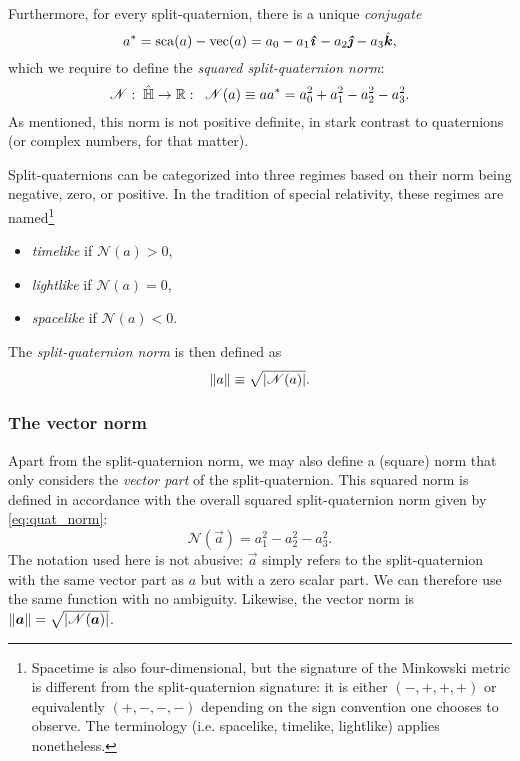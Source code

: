 Furthermore, for every split-quaternion, there is a unique \emph{conjugate}
\begin{equation}
     \conj{a} = \scapart{a} - \vecpart{a} = a_0 - a_1\quati - a_2\quatj - a_3\quatk,
\end{equation}
which we require to define the \emph{squared split-quaternion norm}:
\begin{equation}
    \mathscr{N}:\;\hat{\mathbb{H}} \to \mathbb{R}:\;\;\mathscr{N}(a) \equiv aa^* = a_0^2 + a_1^2 - a_2^2 - a_3^2. 
    \label{eq:quat_norm}
\end{equation}
As mentioned, this norm is not positive definite, in stark contrast to quaternions (or complex numbers, for that matter). 

Split-quaternions can be categorized into three regimes based on their norm being negative, zero, or positive. In the tradition of special relativity, these regimes are named\footnote
{Spacetime is also four-dimensional, but the signature of the Minkowski metric is different from the split-quaternion signature: it is either \((-, +, +, +)\) or equivalently \( (+, -, -, -)\) depending on the sign convention one chooses to observe. The terminology (i.e. spacelike, timelike, lightlike) applies nonetheless.} \cite{Misner1970,Landau1971}
\begin{itemize}
    \item \emph{timelike} if \( \mathscr{N}(a) > 0 \),
    \item \emph{lightlike} if \( \mathscr{N}(a) = 0 \), 
    \item \emph{spacelike} if \( \mathscr{N}(a) < 0 \).
\end{itemize}
The \emph{split-quaternion norm} is then defined as
\begin{equation}
     \norm{a} \equiv \sqrt{\abs{\mathscr{N}(a)}}.
\end{equation}

\subsubsection{The vector norm}
Apart from the split-quaternion norm, we may also define a (square) norm that only considers the \emph{vector part} of the split-quaternion. This squared norm is defined in accordance with the overall squared split-quaternion norm given by \cref{eq:quat_norm}:
\begin{equation}
     \mathscr{N}(\vec{a}) = a_1^2 - a^2_2 - a^2_3.
\end{equation}
The notation used here is not abusive: \(\vec{a}\) simply refers to the split-quaternion with the same vector part as \(a\) but with a zero scalar part. We can therefore use the same function with no ambiguity. Likewise, the vector norm is \( \norm{\vec{a}} = \sqrt{\abs{\mathscr{N}(\vec{a})}} \). 

